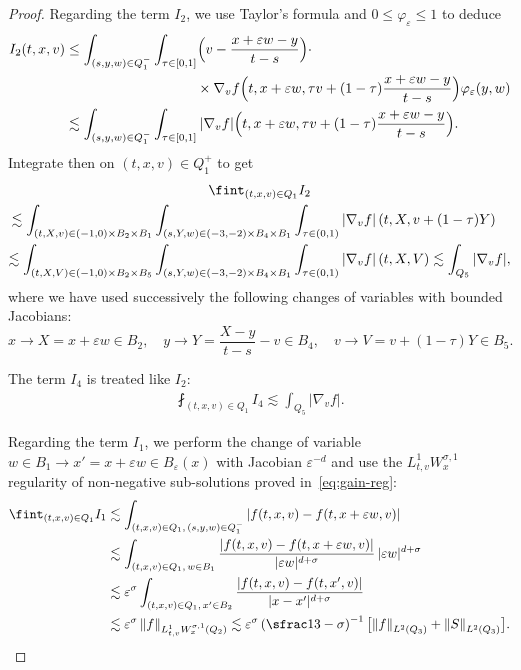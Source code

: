 \documentclass[JEP,XML,SOM,Unicode,NoFloatCountersInSection,published]{cedram}
\theoremstyle{definition}
\theoremstyle{remark}
\newcommand{\norm}[1]{\left\| #1 \right\|}
\let\var\varepsilon
\begin{document}
\begin{proof}
Regarding the term $I_2$, we use Taylor's formula and
$0\leq \varphi_\var\leq 1$ to deduce
\begin{align*}
I_2(t,x,v)
&\leq \int_{(s,y,w) \in Q_1^{-}} \int_{\tau\in [0,1]}
\Bigl(v-\frac{x+\varepsilon w-y}{t-s}\Bigr) \cdot \\
& \hspace{3.3cm} \times \nabla_v
f \Bigl(t,x+\varepsilon w, \tau v +
(1-\tau)\frac{x+\varepsilon w-y}{t-s} \Bigr)
\varphi_\var(y,w) \\
&\lesssim \int_{(s,y,w) \in Q_1^{-}} \int_{\tau\in [0,1]}
|\nabla_v f| \Bigl(t,x+\varepsilon w, \tau v +
(1-\tau)\frac{x+\varepsilon w-y}{t-s} \Bigr).
\end{align*}
Integrate then on $(t,x,v)\in Q_{1}^+$ to get
\begin{multline}
\label{estim I2}
\fint_{(t,x,v) \in Q_1} I_2 \\
\hspace*{-3mm}\lesssim \int_{(t,X,v)\in (-1,0)\times B_2 \times
B_1} \int_{(s,Y,w)\in (-3,-2)\times B_4 \times B_1}
\int_{\tau\in (0,1)} |\nabla_v f| \left(t,X, v+ (1-\tau) Y
\right) \\
\lesssim \int_{(t,X,V)\in (-1,0)\times B_2 \times
B_5} \int_{(s,Y,w)\in (-3,-2)\times B_4 \times B_1}
\int_{\tau\in (0,1)} |\nabla_v f| \left(t,X, V\right)
\lesssim \int_{Q_5} |\nabla_v f|,
\end{multline}
where we have used successively the following changes of
variables with bounded Jacobians:
\begin{equation*}
x\to X=x+\varepsilon w \in B_2, \quad
y\to Y= \frac{X -y}{t-s} -v\in B_4, \quad
v\to V=v+(1-\tau)Y\in B_5.
\end{equation*}

The term $I_4$ is treated like $I_2$:
\begin{align}
\label{estim I4}
\fint_{(t,x,v) \in Q_1} I_4 \lesssim \int_{Q_5} |\nabla_v f|.
\end{align}

Regarding the term $I_1 $, we perform the change of variable
$w \in B_1 \to x'=x+\varepsilon w \in B_\var(x)$ with
Jacobian $\var^{-d}$ and use the $L^1_{t,v} W^{\sigma,1}_{x}$
regularity of non-negative sub-solutions proved
in~\eqref{eq:gain-reg}:\vspace*{-3pt}
\begin{equation}
\label{estim I1}
\begin{aligned}
\fint_{(t,x,v)\in Q_1} I_1
& \lesssim \int_{(t,x,v)\in Q_1, \, (s,y,w)\in Q_1^{-}}
|f(t,x,v)-f(t,x+\varepsilon w,v) | \\
&\lesssim \int_{(t,x,v)\in Q_1, \, w \in B_1}
\frac{|f(t,x,v)-f(t,x+\varepsilon w,v)|}{|\varepsilon w
|^{d+\sigma}}\,|\varepsilon w|^{d+\sigma} \\
&\lesssim \var^\sigma \int_{(t,x,v)\in Q_1, \, x' \in B_2 }
\frac{|f(t,x,v)-f(t,x',v)|}{|x-x'|^{d+\sigma}} \\
& \lesssim \var^\sigma \norm{f}_{L^1_{t,v}W^{\sigma,1}_x(Q_2)}
\lesssim \var^\sigma \left( \sfrac13 -\sigma \right)^{-1}
\bigl[ \norm{f}_{L^2(Q_3)} + \norm{S}_{L^2(Q_3)} \bigr].
\end{aligned}
\end{equation}


\end{proof}
\end{document}
